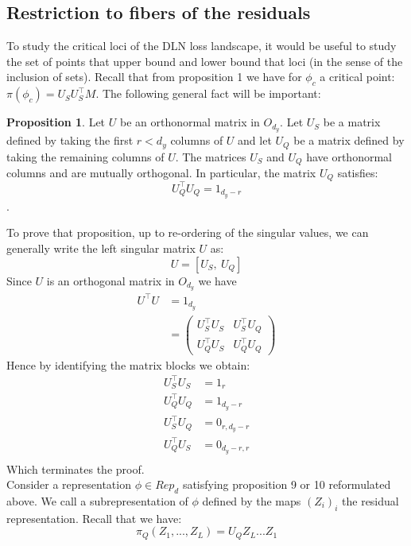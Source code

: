 \documentclass{article}
\theoremstyle{definition}
\newtheorem{proposition}[theorem]{Proposition}
\begin{document}
 \subsection*{Restriction to fibers of the residuals}
 To study the critical loci of the DLN loss landscape, it would be useful to study the set of points that upper bound and lower bound that loci (in the sense of the inclusion of sets).  Recall that from proposition 1 we have for $\phi_c$ a critical point: $\pi(\phi_c) = U_SU_S^{\top}M$. The following general fact will be important:
 \begin{proposition}
    Let $U$ be an orthonormal matrix in $O_{d_y}$. Let $U_S$ be a matrix defined by taking the first $r<d_y$ columns of $U$ and let $U_Q$ be a matrix defined by taking the remaining columns of $U$. The matrices $U_S$ and $U_Q$ have orthonormal columns and are mutually orthogonal. In particular, the matrix $U_Q$ satisfies: $$U_Q^{\top}U_Q = 1_{d_y -r}$$.
 \end{proposition}
To prove that proposition, up to re-ordering of the singular values, we can generally write the left singular matrix $U$ as:
\begin{equation*}
    U = [U_S,\ U_Q] 
\end{equation*}
Since $U$ is an orthogonal matrix in $O_{d_y}$ we have
\begin{align*}
    U^{\top}U & = 1_{d_y} \\
    & = \begin{pmatrix}
        U_S^{\top}U_S & U_S^{\top}U_Q \\
        U_Q^{\top}U_S & U_Q^{\top}U_Q
    \end{pmatrix}
\end{align*}
Hence by identifying the matrix blocks we obtain:
\begin{align*}
    U_S^{\top}U_S & = 1_{r} \\
    U_Q^{\top}U_Q & = 1_{d_y - r} \\
    U_S^{\top}U_Q & = 0_{r, d_y-r} \\
    U_Q^{\top}U_S & = 0_{d_y-r, r} \\
\end{align*}
Which terminates the proof.
\\
Consider a representation $\phi\in Rep_d$ satisfying proposition 9 or 10 reformulated above. We call a subrepresentation of $\phi$ defined by the maps $(Z_i)_i$ the residual representation. Recall that we have:
\begin{equation*}
    \pi_Q(Z_1,...,Z_L) = U_QZ_L...Z_1
\end{equation*}
\end{document}
